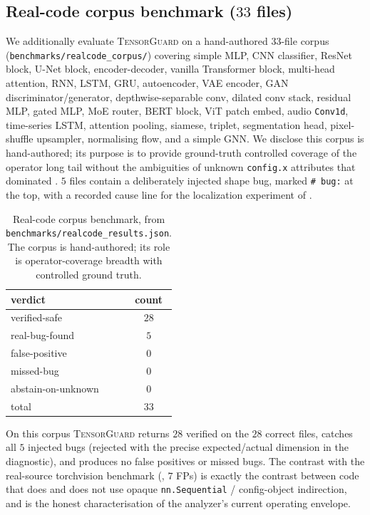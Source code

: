 \documentclass{article}
\theoremstyle{definition}
\begin{document}
\subsection{Real-code corpus benchmark ($33$ files)}
\label{sec:realcode}

We additionally evaluate \textsc{TensorGuard} on a hand-authored
$33$-file corpus
(\verb|benchmarks/realcode_corpus/|) covering simple MLP, CNN
classifier, ResNet block, U-Net block, encoder-decoder, vanilla
Transformer block, multi-head attention, RNN, LSTM, GRU,
autoencoder, VAE encoder, GAN
discriminator/generator,
depthwise-separable conv, dilated conv stack, residual MLP,
gated MLP, MoE router, BERT block, ViT patch embed, audio
\texttt{Conv1d}, time-series LSTM, attention pooling, siamese,
triplet, segmentation head, pixel-shuffle upsampler, normalising
flow, and a simple GNN. We disclose this corpus is hand-authored;
its purpose is to provide ground-truth controlled coverage of the
operator long tail without the ambiguities of unknown
\texttt{config.x} attributes that dominated
. $5$ files contain a deliberately injected
shape bug, marked \verb|# bug:| at the top, with a recorded cause
line for the localization experiment of .

\begin{table}[t]
\centering\small
\caption{Real-code corpus benchmark, from
\texttt{benchmarks/realcode\_results.json}. The corpus is
hand-authored; its role is operator-coverage breadth with
controlled ground truth.}
\label{tab:realcode}
\begin{tabular}{lc}
\toprule
verdict & count \\
\midrule
verified-safe       & $28$ \\
real-bug-found      & $5$  \\
false-positive      & $0$  \\
missed-bug          & $0$  \\
abstain-on-unknown  & $0$  \\
\midrule
total               & $33$ \\
\bottomrule
\end{tabular}
\end{table}

On this corpus \textsc{TensorGuard} returns $28$
\textsf{verified} on the $28$ correct files, catches all $5$
injected bugs (\textsf{rejected} with the precise expected/actual
dimension in the diagnostic), and produces no false positives or
missed bugs. The contrast with the real-source torchvision
benchmark (, $7$ FPs) is exactly the contrast
between code that does and does not use opaque
\texttt{nn.Sequential} / config-object indirection, and is the
honest characterisation of the analyzer's current operating envelope.
\end{document}
